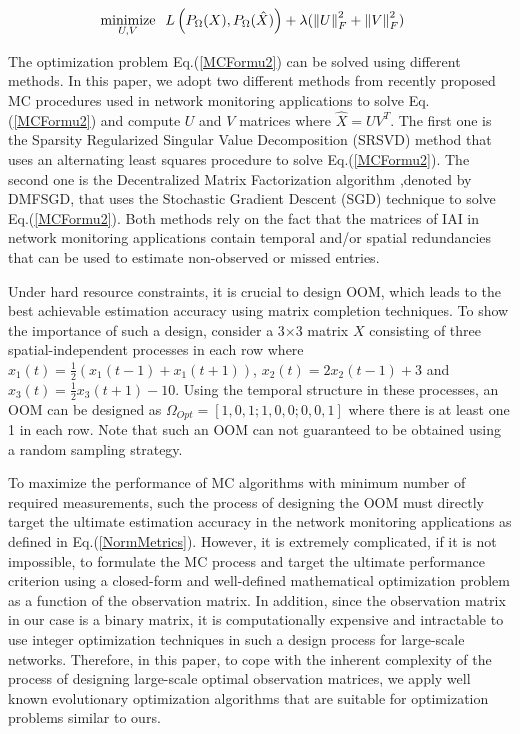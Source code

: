 \begin{equation}\label{MCFormu2}
\begin{aligned}
\underset{U,V}{\text{minimize}} & \hspace{0.25cm} L\left(P_{\Omega}(X),P_{\Omega}(\hat{X})\right) + \lambda ( \left\|U\right\|_{F}^{2} + \left\|V\right\|_{F}^{2} ) 
\end{aligned}
\end{equation}

The optimization problem Eq.(\ref{MCFormu2}) can be solved using different methods. In this paper, we adopt two different methods from recently proposed MC procedures used in network monitoring applications to solve Eq.(\ref{MCFormu2}) and compute $U$ and $V$ matrices where $\hat{X}=UV^{T}$. The first one is the Sparsity Regularized Singular Value Decomposition (SRSVD) method \cite{Roughan:2012} that uses an alternating least squares procedure to solve Eq.(\ref{MCFormu2}). The second one is the Decentralized Matrix Factorization algorithm \cite{YLiao:2011},denoted by DMFSGD, that uses the Stochastic Gradient Descent (SGD) technique to solve Eq.(\ref{MCFormu2}). Both methods rely on the fact that the matrices of IAI in network monitoring applications contain temporal and/or spatial redundancies that can be used to estimate non-observed or missed entries.

Under hard resource constraints, it is crucial to design OOM, which leads to the best achievable estimation accuracy using matrix completion techniques. To show the importance of such a design, consider a 3$\times$3 matrix $X$ consisting of three spatial-independent processes in each row where $x_{1}(t)=\frac{1}{2}(x_{1}(t-1)+x_{1}(t+1))$, $x_{2}(t)=2x_{2}(t-1)+3$ and $x_{3}(t)=\frac{1}{2} x_{3}(t+1)-10$. Using the temporal structure in these processes, an OOM can be designed as $\Omega_{Opt}=[1, 0, 1; 1, 0, 0; 0, 0, 1]$ where there is at least one 1 in each row. Note that such an OOM can not guaranteed to be obtained using a random sampling strategy.

To maximize the performance of MC algorithms with minimum number of required measurements, such the process of designing the OOM must directly target the ultimate estimation accuracy in the network monitoring applications as defined in Eq.(\ref{NormMetrics}). However, it is extremely complicated, if it is not impossible, to formulate the MC process and target the ultimate performance criterion using a closed-form and well-defined mathematical optimization problem as a function of the observation matrix. In addition, since the observation matrix in our case is a binary matrix, it is computationally expensive and intractable to use integer optimization techniques in such a design process for large-scale networks. Therefore, in this paper, to cope with the inherent complexity of the process of designing large-scale optimal observation matrices, we apply well known evolutionary optimization algorithms that are suitable for optimization problems similar to ours.

